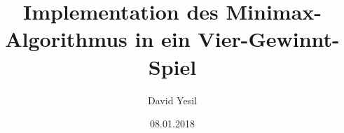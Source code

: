 \documentclass{beamer}
\title{Implementation des Minimax-Algorithmus in ein Vier-Gewinnt-Spiel}
\author{David Yesil}
\institute{Hochschule Augsburg}
\date{08.01.2018}
\begin{document}
	\begin{frame}
		 \titlepage 
	\end{frame}
	
	
	
	
	
	
	

	
	
\end{document}
